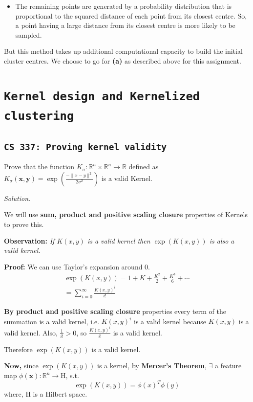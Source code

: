 \documentclass[11pt]{article}
\begin{document}
\begin{itemize}
\begin{itemize}
            \item The remaining points are generated by a probability distribution that is proportional to the squared distance of each point from its closest centre. So, a point having a large distance from its closest centre is more likely to be sampled.
        \end{itemize}
    But this method takes up additional computational capacity to build the initial cluster centres. We choose to go for \textbf{(a)} as described above for this assignment.
\end{itemize}


\section{\texttt{Kernel design and Kernelized clustering}}

\subsection{\texttt{CS 337: Proving kernel validity}}

Prove that the function $K_{\sigma} : \mathbb{R}^{n} \times \mathbb{R}^{n} \longrightarrow \mathbb{R}$ defined as $K_{\sigma} (\mathbf{x}, \mathbf{y}) = \exp\left( \frac{-\lVert x-y \rVert^{2}}{2\sigma^{2}} \right)$ is a valid Kernel. 

\textit{Solution. } 

We will use \textbf{sum, product and positive scaling closure} properties of Kernels to prove this. 

\textbf{Observation: } \textit{If $K(x,y)$ is a valid kernel then $\exp\left(K(x,y)\right)$ is also a valid kernel.}

\textbf{Proof: } We can use Taylor's expansion around 0.%
\begin{gather*}
   \exp\left( K(x,y) \right) = 1 + K + \frac{K^2}{2} + \frac{K^3}{6} + \cdots \\
   = \sum_{i=0}^{\infty} \frac{K(x,y)^{i}}{i!}
\end{gather*}

\textbf{By product and positive scaling closure} properties every term of the summation is a valid kernel, i.e. $K(x,y)^{i}$ is a valid kernel because $K(x,y)$ is a valid kernel. Also, $\frac{1}{i!} > 0$, so $\frac{K(x,y)^{i}}{i!}$ is a valid kernel.

Therefore $\exp\left(K(x,y)\right)$ is a valid kernel.

\textbf{Now,} since $\exp\left(K(x,y)\right)$ is a kernel, by \textbf{Mercer's Theorem}, $\exists$ a feature map $\phi(\mathbf{x}) : \mathbb{R}^{n} \rightarrow \mathrm{H}$, s.t.%
\begin{equation*}
    \exp\left(K(x,y)\right) = \phi(x)^{T}\phi(y)
\end{equation*}%
where, $\mathrm{H}$ is a Hilbert space.
\end{document}
